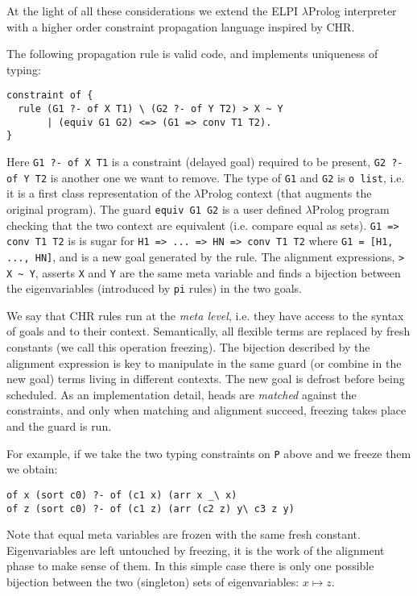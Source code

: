 \documentclass{easychair}
\begin{document}
At the light of all these considerations we extend the ELPI
$\lambda$Prolog interpreter with a higher order constraint propagation
language inspired by CHR.

The following propagation rule is valid code, and implements
uniqueness of typing:

\begin{verbatim}
constraint of {
  rule (G1 ?- of X T1) \ (G2 ?- of Y T2) > X ~ Y
       | (equiv G1 G2) <=> (G1 => conv T1 T2).
}
\end{verbatim}

Here \verb+G1 ?- of X T1+ is a constraint (delayed goal) required
to be present, \verb+G2 ?- of Y T2+ is another one we want to remove.
The type of \verb+G1+ and \verb+G2+ is \verb+o list+, i.e.
it is a first class representation of the $\lambda$Prolog context
(that augments the original program).  
The guard \verb+equiv G1 G2+ is a user defined $\lambda$Prolog program
checking that the two context are equivalent (i.e.
compare equal as sets).  \verb+G1 => conv T1 T2+ is
is sugar for \verb+H1 => ... => HN => conv T1 T2+ where
\verb+G1 = [H1, ..., HN]+, and is a new goal generated by the rule.
The alignment expressions, \verb+> X ~ Y+, asserts \verb+X+ and \verb+Y+
are the same meta variable and finds a bijection between the
eigenvariables (introduced by \verb+pi+ rules) in the two goals.

We say that CHR rules run at the \emph{meta level}, i.e. they have access
to the syntax of goals and to their context.  Semantically, all flexible
terms are replaced by fresh constants (we call this operation freezing).
The bijection described by the alignment expression is key to
manipulate in the same guard (or combine in the new goal) terms
living in different contexts.  The new goal is defrost before being
scheduled.
As an implementation detail, heads are \emph{matched} against the
constraints, and only when matching and alignment succeed, freezing
takes place and the guard is run.

For example, if we take the two typing constraints on \verb+P+ above
and we freeze them we obtain:

\begin{verbatim}
of x (sort c0) ?- of (c1 x) (arr x _\ x)
of z (sort c0) ?- of (c1 z) (arr (c2 z) y\ c3 z y)
\end{verbatim}

Note that equal meta variables are frozen with the same fresh
constant.  Eigenvariables are left untouched by freezing, it is
the work of the alignment phase to make sense of them.
In this simple case there is only one possible bijection
between the two (singleton) sets of eigenvariables: 
$x \mapsto z$.
\end{document}
